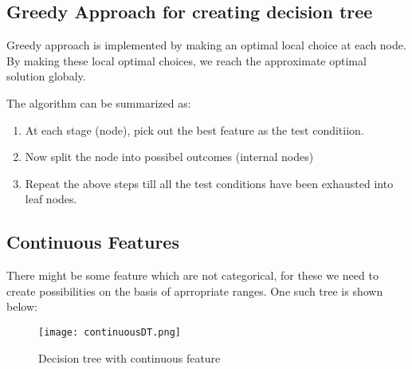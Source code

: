 \subsection*{Greedy Approach for creating decision tree}
	Greedy approach is implemented by making an optimal local choice at each node. By making these local optimal choices, we reach the approximate optimal solution globaly.

	The algorithm can be summarized as: 
	\begin{enumerate}
		\item At each stage (node), pick out the best feature as the test conditiion.
		\item Now split the node into possibel outcomes (internal nodes)
		\item Repeat the above steps till all the test conditions have been exhausted into leaf nodes.
	\end{enumerate}

\vspace{5mm}
\subsection*{Continuous Features}
	There might be some feature which are not categorical, for these we need to create possibilities on the basis of aprropriate ranges. One such tree is shown below:
	\begin{figure}[h]
		\centering
		\texttt{[image: continuousDT.png]}
		\caption{Decision tree with continuous feature}
	\end{figure}


